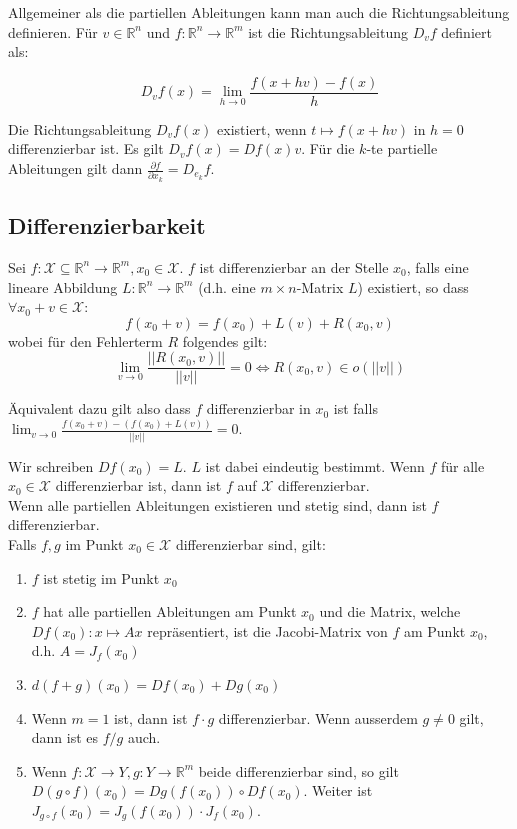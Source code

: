 \documentclass[a4paper,10pt]{article}
\def\R{\mathbb{R}}
\def\X{\mathcal{X}}
\begin{document}
Allgemeiner als die partiellen Ableitungen kann man auch die Richtungsableitung definieren. Für $v \in \R^n$ und $f: \R^n \to \R^m$ ist die Richtungsableitung $D_v f$ definiert als:

$$D_v f(x) = \lim_{h \rightarrow 0} \frac{f(x + hv) - f(x)}{h}$$

 Die Richtungsableitung $D_v f(x)$ existiert, wenn $t \mapsto f(x + hv)$ in $h = 0$ differenzierbar ist. Es gilt $D_v f(x) = D f(x) v$. Für die $k$-te partielle Ableitungen gilt dann $\frac{\partial f}{\partial x_k} = D_{e_k} f$.

\subsection{Differenzierbarkeit}
Sei \(f: \X \subseteq \R^n \to \R^m, x_0 \in \X\). \(f\) ist differenzierbar an der Stelle \(x_0\), falls eine lineare Abbildung \(L: \R^n \to \R^m\) (d.h. eine \(m \times n\)-Matrix \(L\)) existiert, so dass \(\forall x_0 + v \in \X\):
\[f(x_0 + v) = f(x_0) + L(v) + R(x_0,v)\]
wobei für den Fehlerterm \(R\) folgendes gilt: 
$$\lim_{v \to 0} \frac{||R(x_0,v)||}{||v||} = 0 \iff R(x_0, v) \in o(||v||)$$

Äquivalent dazu gilt also dass $f$ differenzierbar in $x_0$ ist falls $\lim_{v \rightarrow 0} \frac{f(x_0 + v) - (f(x_0) + L(v))}{||v||} = 0$.

Wir schreiben \(Df(x_0) = L\). $L$ ist dabei eindeutig bestimmt. Wenn \(f\) für alle \(x_0 \in \X\) differenzierbar ist, dann ist \(f\) auf \(\X\) differenzierbar. \\

Wenn alle partiellen Ableitungen existieren und stetig sind, dann ist \(f\) differenzierbar.\\
Falls \(f,g\) im Punkt \(x_0 \in \X\) differenzierbar sind, gilt:
\begin{enumerate}
  \item \(f\) ist stetig im Punkt \(x_0\)
  \item \(f\) hat alle partiellen Ableitungen am Punkt \(x_0\) und die Matrix, welche \(Df(x_0): x \mapsto Ax\) repräsentiert, ist die Jacobi-Matrix von \(f\) am Punkt \(x_0\), d.h. \(A = J_f(x_0)\)
  \item \(d(f+g)(x_0) = Df(x_0) + Dg(x_0)\)
  \item Wenn \(m = 1\) ist, dann ist \(f\cdot g\) differenzierbar. Wenn ausserdem \(g \ne 0\) gilt, dann ist es \(f/g\) auch.
  \item Wenn \(f: \X \to Y, g: Y \to \R^m\) beide differenzierbar sind, so gilt \(D(g \circ f)(x_0) = Dg(f(x_0)) \circ Df(x_0)\). 
  Weiter ist \(J_{g \circ f}(x_0) = J_g(f(x_0)) \cdot J_f(x_0)\).
\end{enumerate}
\end{document}

